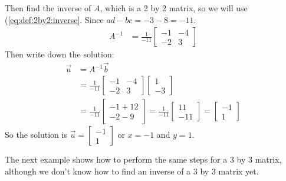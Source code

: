 \begin{example}
Then find the inverse of $A$, which is a 2 by 2 matrix, so we will use (\ref{eq:def:2by2:inverse}.    Since 
 $ad-bc = -3 -8 = -11$. 
\begin{align*}
A^{-1} & = \frac{1}{-11}
\begin{bmatrix}
-1 & -4 \\ -2 & 3 
\end{bmatrix}
\end{align*}
Then write down the solution: 
\begin{align*}
\vec{u} & = A^{-1} \vec{b} \\
& = \frac{1}{-11}
\begin{bmatrix}
-1 & -4 \\ -2 & 3 
\end{bmatrix}
\begin{bmatrix}
1 \\ -3
\end{bmatrix}
\\
& = \frac{1}{-11} \begin{bmatrix}
-1+12 \\ -2-9 
\end{bmatrix} = \frac{1}{-11} \begin{bmatrix}
11 \\ -11
\end{bmatrix} = 
\begin{bmatrix}
	-1 \\ 1 
\end{bmatrix}
\end{align*}
So the solution is $\vec{u} = 
\begin{bmatrix}
	-1 \\ 1
\end{bmatrix}$ or $x=-1$ and $y=1$.  
\end{example}

The next example shows how to perform the same steps for a 3 by 3 matrix, although we don't know how to find an inverse of a 3 by 3 matrix yet.  

